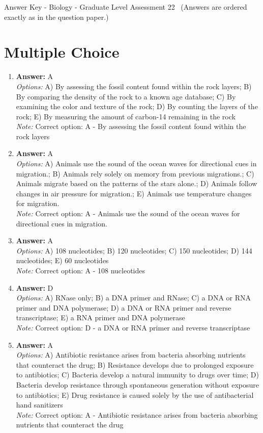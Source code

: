 \documentclass[12pt]{article}
\begin{document}
\begin{center}
Answer Key - Biology - Graduate Level Assessment 22 \
\small (Answers are ordered exactly as in the question paper.)
\end{center}

\section*{Multiple Choice}
\begin{enumerate}[label=\arabic*.]
\item \textbf{Answer:} A
\\ \textit{Options:} A) By assessing the fossil content found within the rock layers; B) By comparing the density of the rock to a known age database; C) By examining the color and texture of the rock; D) By counting the layers of the rock; E) By measuring the amount of carbon-14 remaining in the rock
\\ \textit{Note:} Correct option: A - By assessing the fossil content found within the rock layers
\item \textbf{Answer:} A
\\ \textit{Options:} A) Animals use the sound of the ocean waves for directional cues in migration.; B) Animals rely solely on memory from previous migrations.; C) Animals migrate based on the patterns of the stars alone.; D) Animals follow changes in air pressure for migration.; E) Animals use temperature changes for migration.
\\ \textit{Note:} Correct option: A - Animals use the sound of the ocean waves for directional cues in migration.
\item \textbf{Answer:} A
\\ \textit{Options:} A) 108 nucleotides; B) 120 nucleotides; C) 150 nucleotides; D) 144 nucleotides; E) 60 nucleotides
\\ \textit{Note:} Correct option: A - 108 nucleotides
\item \textbf{Answer:} D
\\ \textit{Options:} A) RNase only; B) a DNA primer and RNase; C) a DNA or RNA primer and DNA polymerase; D) a DNA or RNA primer and reverse transcriptase; E) a RNA primer and DNA polymerase
\\ \textit{Note:} Correct option: D - a DNA or RNA primer and reverse transcriptase
\item \textbf{Answer:} A
\\ \textit{Options:} A) Antibiotic resistance arises from bacteria absorbing nutrients that counteract the drug; B) Resistance develops due to prolonged exposure to antibiotics; C) Bacteria develop a natural immunity to drugs over time; D) Bacteria develop resistance through spontaneous generation without exposure to antibiotics; E) Drug resistance is caused solely by the use of antibacterial hand sanitizers
\\ \textit{Note:} Correct option: A - Antibiotic resistance arises from bacteria absorbing nutrients that counteract the drug
\end{enumerate}
\end{document}
